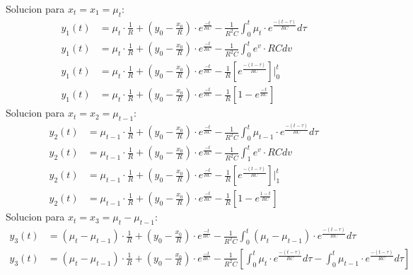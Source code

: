 \documentclass[12pt,a4paper]{report}
\begin{document}
\begin{enumerate}[label=\alph*)]
      Solucion para $x_t = x_1 = \mu_t$:
      \begin{align*}
        y_1(t) &= \mu_t \cdot \frac{1}{R} + \left(y_0 - \frac{x_0}{R}\right) \cdot
          e^{\frac{-t}{RC}} - \frac{1}{R^2C} \int_{0}^{t} \mu_t \cdot e^{\frac{-(t-\tau)}{RC}} d\tau\\[6pt]
        y_1(t) &= \mu_t \cdot \frac{1}{R} + \left(y_0 - \frac{x_0}{R}\right) \cdot e^{\frac{-t}{RC}} -
          \frac{1}{R^2C} \int_{0}^{t} e^v \cdot RCdv\\[6pt]
        y_1(t) &= \mu_t \cdot \frac{1}{R} + \left(y_0 - \frac{x_0}{R}\right) \cdot e^{\frac{-t}{RC}} -
          \frac{1}{R} \left[e^{\frac{-(t-\tau)}{RC}}\right]\Big|_{0}^{t}\\[6pt]
        y_1(t) &= \mu_t \cdot \frac{1}{R} + \left(y_0 - \frac{x_0}{R}\right) \cdot e^{\frac{-t}{RC}} - \frac{1}{R}
          \left[1 - e^{\frac{-t}{RC}}\right]
      \end{align*}
      Solucion para $x_t = x_2 = \mu_{t-1}$:
      \begin{align*}
        y_2(t) &= \mu_{t-1} \cdot \frac{1}{R} + \left(y_0 - \frac{x_0}{R}\right) \cdot
          e^{\frac{-t}{RC}} - \frac{1}{R^2C} \int_{0}^{t} \mu_{t-1} \cdot e^{\frac{-(t-\tau)}{RC}} d\tau\\[6pt]
        y_2(t) &= \mu_{t-1} \cdot \frac{1}{R} + \left(y_0 - \frac{x_0}{R}\right) \cdot e^{\frac{-t}{RC}} -
          \frac{1}{R^2C} \int_{1}^{t} e^v \cdot RCdv\\[6pt]
        y_2(t) &= \mu_{t-1} \cdot \frac{1}{R} + \left(y_0 - \frac{x_0}{R}\right) \cdot e^{\frac{-t}{RC}} -
          \frac{1}{R} \left[e^{\frac{-(t-\tau)}{RC}}\right]\Big|_{1}^{t}\\[6pt]
        y_2(t) &= \mu_{t-1} \cdot \frac{1}{R} + \left(y_0 - \frac{x_0}{R}\right) \cdot e^{\frac{-t}{RC}} -
          \frac{1}{R} \left[1 - e^{\frac{1-t}{RC}}\right]
      \end{align*}
      Solucion para $x_t = x_3 = \mu_t - \mu_{t-1}$:
      \begin{align*}
        y_3(t) &= (\mu_t - \mu_{t-1}) \cdot \frac{1}{R} + \left(y_0 - \frac{x_0}{R}\right) \cdot e^{\frac{-t}{RC}} -
          \frac{1}{R^2C} \int_{0}^{t} (\mu_t - \mu_{t-1}) \cdot e^{\frac{-(t-\tau)}{RC}} d\tau\\[6pt]
        y_3(t) &= (\mu_t - \mu_{t-1}) \cdot \frac{1}{R} + \left(y_0 - \frac{x_0}{R}\right) \cdot e^{\frac{-t}{RC}} -
          \frac{1}{R^2C} \left[\int_{0}^{t} \mu_t \cdot e^{\frac{-(t-\tau)}{RC}} d\tau -
          \int_{0}^{t} \mu_{t-1} \cdot e^{\frac{-(t-\tau)}{RC}} d\tau \right]\\[6pt]

\end{align*}
\end{enumerate}
\end{document}
